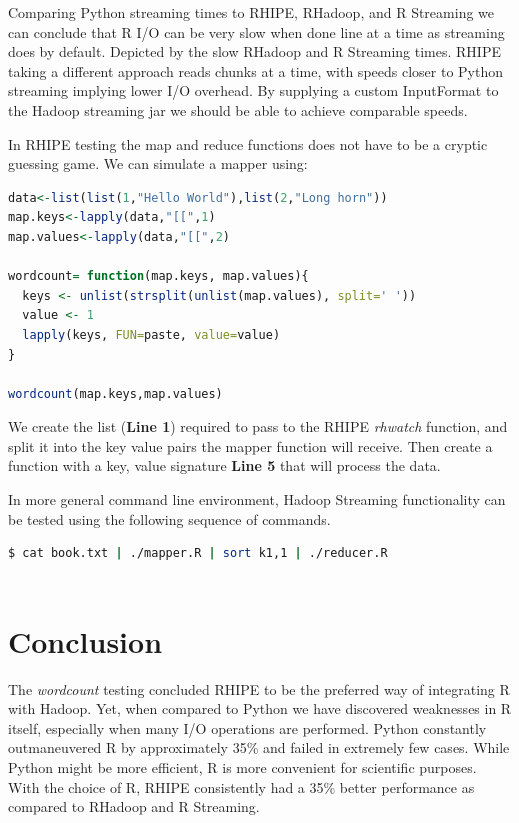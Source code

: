 \documentclass[
journal=jacsat, %
manuscript=article]{achemso}
\begin{document}
Comparing Python streaming times to RHIPE, RHadoop, and R Streaming we can conclude that R I/O can be very slow when done line at a time as streaming does by default. Depicted by the slow RHadoop and R Streaming times. RHIPE taking a different approach reads chunks at a time, with speeds closer to Python streaming implying lower I/O overhead. By supplying a custom InputFormat to the Hadoop streaming jar we should be able to achieve comparable speeds. 

In RHIPE testing the map and reduce functions does not have to be a cryptic guessing game. We can simulate a mapper using: 

\begin{lstlisting}[language=R]
data<-list(list(1,"Hello World"),list(2,"Long horn"))
map.keys<-lapply(data,"[[",1)
map.values<-lapply(data,"[[",2)

wordcount= function(map.keys, map.values){
  keys <- unlist(strsplit(unlist(map.values), split=' '))
  value <- 1
  lapply(keys, FUN=paste, value=value)
}

wordcount(map.keys,map.values)
\end{lstlisting}

We create the list (\textbf{Line 1}) required to pass to the RHIPE \textit{rhwatch} function, and split it into the key value pairs the mapper function will receive. Then create a function with a key, value signature \textbf{Line 5} that will process the data.  

In more general command line environment, Hadoop Streaming functionality can be tested using the following sequence of commands. 

\begin{lstlisting}[language=bash]
 $ cat book.txt | ./mapper.R | sort k1,1 | ./reducer.R
 
\end{lstlisting}

\section{Conclusion}
The \textit{wordcount} testing concluded RHIPE to be the preferred way of integrating R with Hadoop. Yet, when compared to Python we have discovered weaknesses in R itself, especially when many I/O operations are performed. Python constantly outmaneuvered R by approximately 35\% and failed in extremely few cases. While Python might be more efficient, R is more convenient for scientific purposes. 
With the choice of R, RHIPE consistently had a 35\% better performance as compared to RHadoop and R Streaming.
\end{document}
